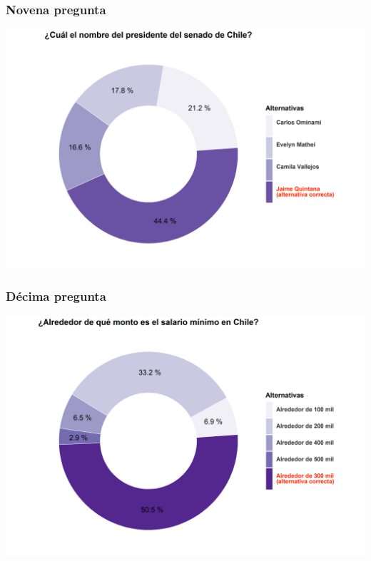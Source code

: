 \documentclass[
  14pt,
]{book}
\begin{document}
\hypertarget{novena-pregunta}{%
\subsubsection{Novena pregunta}\label{novena-pregunta}}

\begin{center}\includegraphics[width=52.49in]{images/ccivico_9} \end{center}

\hypertarget{duxe9cima-pregunta}{%
\subsubsection{Décima pregunta}\label{duxe9cima-pregunta}}

\begin{center}\includegraphics[width=52.49in]{images/ccivico_10} \end{center}
\end{document}
